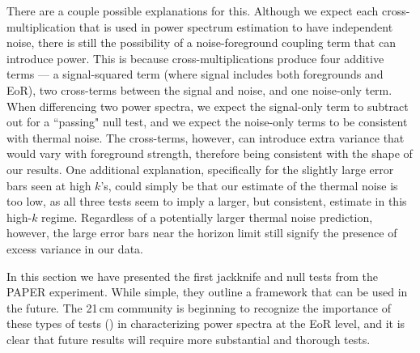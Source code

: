 \documentclass[preprint2,numberedappendix,tighten]{aastex6}
\begin{document}
There are a couple possible explanations for this. Although we expect each cross-multiplication that is used in power spectrum estimation to have independent noise, there is still the possibility of a noise-foreground coupling term that can introduce power. This is because cross-multiplications produce four additive terms --- a signal-squared term (where signal includes both foregrounds and EoR), two cross-terms between the signal and noise, and one noise-only term. When differencing two power spectra, we expect the signal-only term to subtract out for a ``passing" null test, and we expect the noise-only terms to be consistent with thermal noise. The cross-terms, however, can introduce extra variance that would vary with foreground strength, therefore being consistent with the shape of our results.  One additional explanation, specifically for the slightly large error bars seen at high $k$'s, could simply be that our estimate of the thermal noise is too low, as all three tests seem to imply a larger, but consistent, estimate in this high-$k$ regime. Regardless of a potentially larger thermal noise prediction, however, the large error bars near the horizon limit still signify the presence of excess variance in our data.

In this section we have presented the first jackknife and null tests from the PAPER experiment. While simple, they outline a framework that can be used in the future. The 21\,cm community is beginning to recognize the importance of these types of tests (\citealt{pober_et_al2016b}) in characterizing power spectra at the EoR level, and it is clear that future results will require more substantial and thorough tests.


\end{document}
